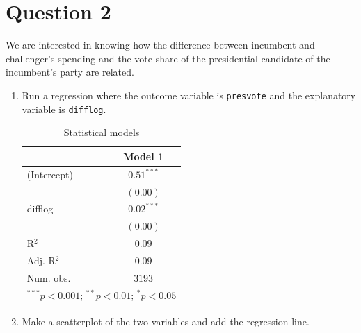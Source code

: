 \documentclass[12pt,letterpaper]{article}
\begin{document}
\section*{Question 2}
\noindent We are interested in knowing how the difference between incumbent and challenger's spending and the vote share of the presidential candidate of the incumbent's party are related.	\vspace{.25cm}
	\begin{enumerate}
		\item Run a regression where the outcome variable is \texttt{presvote} and the explanatory variable is \texttt{difflog}.	
		 
		
		\begin{table}[H]
\begin{center}
\begin{tabular}{l c}
\hline
 & Model 1 \\
\hline
(Intercept) & $0.51^{***}$ \\
            & $(0.00)$     \\
difflog     & $0.02^{***}$ \\
            & $(0.00)$     \\
\hline
R$^2$       & $0.09$       \\
Adj. R$^2$  & $0.09$       \\
Num. obs.   & $3193$       \\
\hline
\multicolumn{2}{l}{\scriptsize{$^{***}p<0.001$; $^{**}p<0.01$; $^{*}p<0.05$}}
\end{tabular}
\caption{Statistical models}
\label{table:coefficients}
\end{center}
\end{table}
	
		\item Make a scatterplot of the two variables and add the regression line. 	
		 \vspace{7cm}
		

\end{enumerate}
\end{document}
